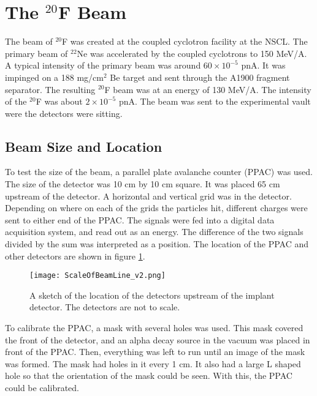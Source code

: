 \documentclass[../MaxHughesThesis.tex]{subfiles}
\begin{document}
\section{The $^{20}$F Beam}

The beam of $^{20}$F was created at the coupled cyclotron facility at the NSCL.
The primary beam of $^{22}$Ne was accelerated by the coupled cyclotrons to 150 MeV/A. 
A typical intensity of the primary beam was around $60 \times 10^{-5}$ pnA.
It was impinged on a 188 mg/cm$^{2}$ Be target and sent through the A1900 fragment separator. 
The resulting $^{20}$F beam was at an energy of 130 MeV/A. 
The intensity of the $^{20}$F was about $2 \times 10^{-5}$ pnA.
The beam was sent to the experimental vault were the detectors were sitting.

\subsection{Beam Size and Location}
\label{sec:beamsize}
To test the size of the beam, a parallel plate avalanche counter (PPAC) was used.
The size of the detector was 10 cm by 10 cm square. 
It was placed 65 cm upstream of the detector.
A horizontal and vertical grid was in the detector.
Depending on where on each of the grids the particles hit, different charges were sent to either end of the PPAC.
The signals were fed into a digital data acquisition system, and read out as an energy.
The difference of the two signals divided by the sum was interpreted as a position.
The location of the PPAC and other detectors are shown in figure \ref{fig:BeamSetUp}.

\begin{figure}
	\centerline{\texttt{[image: ScaleOfBeamLine\_v2.png]}}
	\caption{A sketch of the location of the detectors upstream of the implant detector.
		    The detectors are not to scale. 
			}
	\label{fig:BeamSetUp}
\end{figure}  

To calibrate the PPAC, a mask with several holes was used. 
This mask covered the front of the detector, and an alpha decay source in the vacuum was placed in front of the PPAC.
Then, everything was left to run until an image of the mask was formed.
The mask had holes in it every 1 cm. 
It also had a large L shaped hole so that the orientation of the mask could be seen. 
With this, the PPAC could be calibrated.
\end{document}
